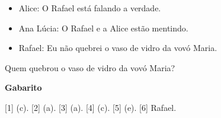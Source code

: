 \documentclass[12pt,a4paper]{article}
\begin{document}
\begin{enumerate}
    \begin{itemize}   
      \item Alice: O Rafael está falando a verdade.
      \item Ana Lúcia: O Rafael e a Alice estão mentindo.
      \item Rafael: Eu não quebrei o vaso de vidro da vovó Maria.
    \end{itemize}
    
    Quem quebrou o vaso de vidro da vovó Maria?

\end{enumerate}

\begin{center}
  \textbf{Gabarito}
\end{center}

[1] (c). 
[2] (a). 
[3] (a).
[4] (c). 
[5] (e). 
[6] Rafael.
\end{document}
